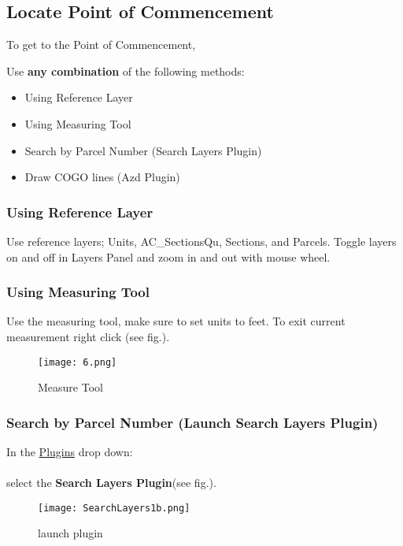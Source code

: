 \documentclass{report}
\begin{document}
\subsection{Locate Point of Commencement}
To get to the Point of Commencement,
\medskip

Use \textbf{any combination} of the following methods:
\begin{itemize}
	\item{Using Reference Layer}
	\item{Using Measuring Tool}
	\item{Search by Parcel Number \small(Search Layers Plugin)}
	\item{Draw COGO lines \small(Azd Plugin)}
\end{itemize}

\subsubsection{Using Reference Layer}

{\large Use reference layers; Units, AC\_SectionsQu, Sections, and Parcels.  Toggle layers on and off in Layers Panel and zoom in and out with mouse wheel.}
\pagebreak

\subsubsection{Using Measuring Tool}
\large Use the measuring tool, make sure to set units to feet.  To exit current measurement right click (see fig.).

\begin{figure}[H]
\begin{center}
	\texttt{[image: 6.png]} 
	\end{center}
	\caption{Measure Tool}
\end{figure}
\pagebreak

\subsubsection{Search by Parcel Number \small(Launch Search Layers Plugin)}
In the \underline{Plugins} drop down:\\\\ select the \textbf{Search Layers Plugin}(see fig.).
\begin{figure}[H] %
\begin{center}
	\texttt{[image: SearchLayers1b.png]}
	\end{center}
	\caption{launch plugin}	
\end{figure}
\pagebreak
\end{document}
